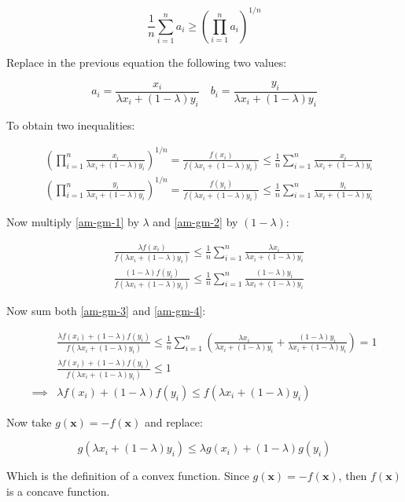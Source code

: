 \documentclass{article}
\begin{document}
\[
    \frac{1}{n} \sum_{i=1}^{n} a_i \geq \left( \prod_{i=1}^{n} a_i \right)^{1/n}
\]

Replace in the previous equation the following two values:

\[
    a_i = \frac{x_i}{\lambda x_i + (1 - \lambda) y_i} \quad b_i = \frac{y_i}{\lambda x_i + (1 - \lambda) y_i}
\]

To obtain two inequalities:

\begin{align}
     & \left( \prod_{i=1}^{n} \frac{x_i}{\lambda x_i + (1 - \lambda) y_i} \right)^{1/n} = \frac{f(x_i)}{f(\lambda x_i + (1 - \lambda) y_i)} \leq \frac{1}{n} \sum_{i=1}^{n} \frac{x_i}{\lambda x_i + (1 - \lambda) y_i} \label{am-gm-1} \\
     & \left( \prod_{i=1}^{n} \frac{y_i}{\lambda x_i + (1 - \lambda) y_i} \right)^{1/n} = \frac{f(y_i)}{f(\lambda x_i + (1 - \lambda) y_i)} \leq \frac{1}{n} \sum_{i=1}^{n} \frac{y_i}{\lambda x_i + (1 - \lambda) y_i} \label{am-gm-2}
\end{align}

Now multiply \eqref{am-gm-1} by $\lambda$ and \eqref{am-gm-2} by $(1 - \lambda)$:

\begin{align}
     & \frac{\lambda f(x_i)}{f(\lambda x_i + (1 - \lambda) y_i)} \leq \frac{1}{n} \sum_{i=1}^{n} \frac{\lambda x_i}{\lambda x_i + (1 - \lambda) y_i} \label{am-gm-3}             \\
     & \frac{(1 - \lambda) f(y_i)}{f(\lambda x_i + (1 - \lambda) y_i)} \leq \frac{1}{n} \sum_{i=1}^{n} \frac{(1 - \lambda) y_i}{\lambda x_i + (1 - \lambda) y_i} \label{am-gm-4}
\end{align}

Now sum both \eqref{am-gm-3} and \eqref{am-gm-4}:

\begin{align*}
             & \frac{\lambda f(x_i) + (1 - \lambda) f(y_i)}{f(\lambda x_i + (1 - \lambda) y_i)} \leq \frac{1}{n} \sum_{i=1}^{n} \left( \frac{\lambda x_i}{\lambda x_i + (1 - \lambda) y_i} + \frac{(1 - \lambda) y_i}{\lambda x_i + (1 - \lambda) y_i} \right) = 1 \\
             & \frac{\lambda f(x_i) + (1 - \lambda) f(y_i)}{f(\lambda x_i + (1 - \lambda) y_i)} \leq 1                                                                                                                                                             \\
    \implies & \lambda f(x_i) + (1 - \lambda) f(y_i) \leq f(\lambda x_i + (1 - \lambda) y_i)
\end{align*}

Now take $g(\bm{x}) = -f(\bm{x})$ and replace:

\[
    g(\lambda x_i + (1 - \lambda) y_i) \leq \lambda  g(x_i) + (1 - \lambda) g(y_i)
\]

Which is the definition of a convex function. Since $g(\bm{x}) = -f(\bm{x})$, then $f(\bm{x}) $ is a concave function.
\end{document}
